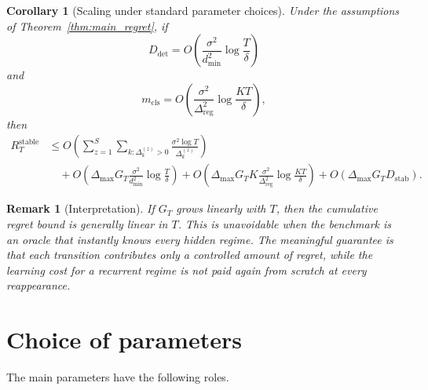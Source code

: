 \documentclass[11pt]{article}
\newtheorem{corollary}{Corollary}
\newtheorem{remark}{Remark}
\begin{document}
\begin{corollary}[Scaling under standard parameter choices]
\label{cor:scaling}
Under the assumptions of Theorem~\ref{thm:main_regret}, if
\begin{equation}
\label{eq:d_det_scaling_corollary}
D_{\mathrm{det}}
=
O\left(\frac{\sigma^2}{d_{\min}^2}\log\frac{T}{\delta}\right)
\end{equation}
and
\begin{equation}
\label{eq:m_cls_scaling_corollary}
m_{\mathrm{cls}}
=
O\left(\frac{\sigma^2}{\Delta_{\mathrm{reg}}^2}\log\frac{KT}{\delta}\right),
\end{equation}
then
\begin{align}
\label{eq:scaling_regret_bound}
R_T^{\mathrm{stable}}
&\leq
O\left(
\sum_{z=1}^{S}
\sum_{k:\Delta_k^{(z)}>0}
\frac{\sigma^2\log T}{\Delta_k^{(z)}}
\right)
\\
&\quad
+
O\left(
\Delta_{\max}G_T
\frac{\sigma^2}{d_{\min}^2}
\log\frac{T}{\delta}
\right)
+
O\left(
\Delta_{\max}G_TK
\frac{\sigma^2}{\Delta_{\mathrm{reg}}^2}
\log\frac{KT}{\delta}
\right)
+
O(\Delta_{\max}G_TD_{\mathrm{stab}}).
\end{align}
\end{corollary}

\begin{remark}[Interpretation]
If $G_T$ grows linearly with $T$, then the cumulative regret bound is generally linear in $T$. This is unavoidable when the benchmark is an oracle that instantly knows every hidden regime. The meaningful guarantee is that each transition contributes only a controlled amount of regret, while the learning cost for a recurrent regime is not paid again from scratch at every reappearance.
\end{remark}

\section{Choice of parameters}
\label{sec:parameters}

The main parameters have the following roles.
\end{document}
